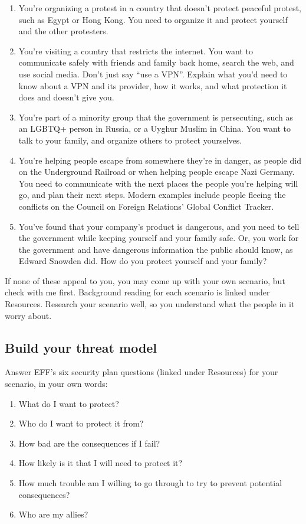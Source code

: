 \documentclass[12pt]{article}
\begin{document}
\begin{enumerate}
    \item You're organizing a protest in a country that doesn't protect peaceful protest, such as Egypt or Hong Kong. You need to organize it and protect yourself and the other protesters.
    \item You're visiting a country that restricts the internet. You want to communicate safely with friends and family back home, search the web, and use social media. Don't just say ``use a VPN''. Explain what you'd need to know about a VPN and its provider, how it works, and what protection it does and doesn't give you.
    \item You're part of a minority group that the government is persecuting, such as an LGBTQ+ person in Russia, or a Uyghur Muslim in China. You want to talk to your family, and organize others to protect yourselves.
    \item You're helping people escape from somewhere they're in danger, as people did on the Underground Railroad or when helping people escape Nazi Germany. You need to communicate with the next places the people you're helping will go, and plan their next steps. Modern examples include people fleeing the conflicts on the Council on Foreign Relations' Global Conflict Tracker.
    \item You've found that your company's product is dangerous, and you need to tell the government while keeping yourself and your family safe. Or, you work for the government and have dangerous information the public should know, as Edward Snowden did. How do you protect yourself and your family?
\end{enumerate}
If none of these appeal to you, you may come up with your own scenario, but check with me first. Background reading for each scenario is linked under Resources. Research your scenario well, so you understand what the people in it worry about.

\subsection*{Build your threat model}
Answer EFF's six security plan questions (linked under Resources) for your scenario, in your own words:
\begin{enumerate}
    \item What do I want to protect?
    \item Who do I want to protect it from?
    \item How bad are the consequences if I fail?
    \item How likely is it that I will need to protect it?
    \item How much trouble am I willing to go through to try to prevent potential consequences?
    \item Who are my allies?
\end{enumerate}
\end{document}
